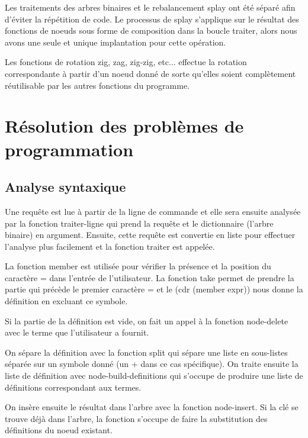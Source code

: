 \documentclass{article}
\begin{document}
  Les traitements des arbres binaires et le rebalancement splay ont été séparé
  afin d'éviter la répétition de code. Le processus de splay s'applique sur le
  résultat des fonctions de noeuds sous forme de composition dans la boucle
  \textsf{traiter}, alors nous avons une seule et unique implantation pour cette
  opération.

  Les fonctions de rotation \textsf{zig}, \textsf{zag}, \textsf{zig-zig}, etc...
  effectue la rotation correspondante à partir d'un noeud donné de sorte
  qu'elles soient complètement réutilisable par les autres fonctions du
  programme.

  

  \section{Résolution des problèmes de programmation}

  \subsection{Analyse syntaxique}
  Une requête est lue à partir de la ligne de commande et elle sera ensuite
  analysée par la fonction traiter-ligne qui prend la requête et le
  dictionnaire (l'arbre binaire) en argument. Ensuite, cette requête est
  convertie en liste pour effectuer l'analyse plus facilement et la fonction
  traiter est appelée.

  La fonction \textsf{member} est utilisée pour vérifier la présence et la
  position du caractère \textsf{=} dans l'entrée de l'utilisateur. La fonction
  \textsf{take} permet de prendre la partie qui précède le premier caractère
  \textsf{=} et le \textsf{(cdr (member expr))} nous donne la
  définition en excluant ce symbole.

  Si la partie de la définition est vide, on fait un appel à la fonction
  \textsf{node-delete} avec le terme que l'utilisateur a fournit.

  On sépare la définition avec la fonction \textsf{split} qui sépare une liste
  en sous-listes séparée sur un symbole donné (un \textsf{+} dans ce cas
  spécifique). On traite ensuite la liste de définition avec
  \textsf{node-build-definitions} qui s'occupe de produire une liste de
  définitions correspondant aux termes.

  On insère ensuite le résultat dans l'arbre avec la fonction
  \textsf{node-insert}. Si la clé se trouve déjà dans l'arbre, la fonction
  s'occupe de faire la substitution des définitions du noeud existant.
\end{document}
